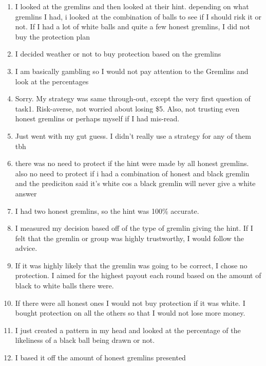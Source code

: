 \documentclass[12pt,a4paper]{article}
\begin{document}
\begin{enumerate}
\item I looked at the gremlins and then looked at their hint. depending on what gremlins I had, i looked at the combination of balls to see if I should risk it or not. If I had a lot of white balls and quite a few honest gremlins, I did not buy the protection plan

\item I decided weather or not to buy protection based on the gremlins

\item I am basically gambling so I would not pay attention to the Gremlins and look at the percentages

\item Sorry. My strategy was same through-out, except the very first question of task1. Risk-averse, not worried about losing \$5. Also, not trusting even honest gremlins or perhaps myself if I had mis-read.

\item Just went with my gut guess. I didn't really use a strategy for any of them tbh

\item there was no need to protect if the hint were made by all honest gremlins. also no need to protect if i had a combination of honest and black gremlin and the prediciton said it's white cos a black gremlin will never give a white answer

\item I had two honest gremlins, so the hint was 100\% accurate.

\item I measured my decision based off of the type of gremlin giving the hint. If I felt that the gremlin or group was highly trustworthy, I would follow the advice.

\item If it was highly likely that the gremlin was going to be correct, I chose no protection. I aimed for the highest payout each round based on the amount of black to white balls there were.

\item If there were all honest ones I would not buy protection if it was white. I bought protection on all the others so that I would not lose more money.

\item I just created a pattern in my head and looked at the percentage of the likeliness of a black ball being drawn or not.

\item I based it off the amount of honest gremlins presented


\end{enumerate}
\end{document}
